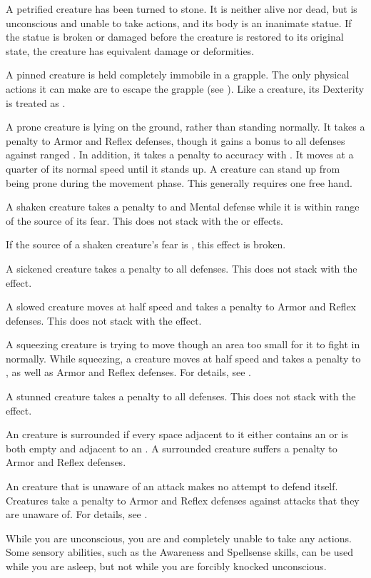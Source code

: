  A petrified creature has been turned to stone. It is neither alive nor dead, but is unconscious and unable to take actions, and its body is an inanimate statue. If the statue is broken or damaged before the creature is restored to its original state, the creature has equivalent damage or deformities.

 A pinned creature is held completely immobile in a grapple.
The only physical actions it can make are to escape the grapple (see ).
Like a  creature, its Dexterity is treated as .

 A prone creature is lying on the ground, rather than standing normally.
It takes a  penalty to Armor and Reflex defenses, though it gains a  bonus to all defenses against ranged .
In addition, it takes a  penalty to accuracy with .
It moves at a quarter of its normal speed until it stands up.
A creature can stand up from being prone during the movement phase.
This generally requires one free hand.

 A shaken creature takes a  penalty to  and Mental defense while it is within \rngmed range of the source of its fear.
This does not stack with the  or  effects.

If the source of a shaken creature's fear is , this effect is broken.

 A sickened creature takes a  penalty to all defenses.
This does not stack with the  effect.

 A slowed creature moves at half speed and takes a  penalty to Armor and Reflex defenses.
This does not stack with the  effect.

 A squeezing creature is trying to move though an area too small for it to fight in normally.
While squeezing, a creature moves at half speed and takes a  penalty to , as well as Armor and Reflex defenses.
For details, see .

 A stunned creature takes a  penalty to all defenses.
This does not stack with the  effect.

 An creature is surrounded if every space adjacent to it either contains an  or is both empty and adjacent to an .
A surrounded creature suffers a  penalty to Armor and Reflex defenses.

 An creature that is unaware of an attack makes no attempt to defend itself.
Creatures take a  penalty to Armor and Reflex defenses against attacks that they are unaware of.
For details, see .

 While you are unconscious, you are  and completely unable to take any actions.
Some sensory abilities, such as the Awareness and Spellsense skills, can be used while you are asleep, but not while you are forcibly knocked unconscious.
